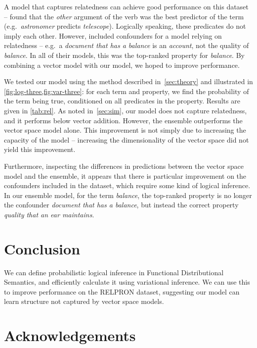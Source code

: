 \documentclass[11pt]{article}
\begin{document}
A model that captures relatedness can achieve good performance on this dataset --
\citeauthor{rimell2016relpron} found that the \textit{other} argument of the verb
was the best predictor of the term
(e.g.\ \textit{astronomer} predicts \textit{telescope}).
Logically speaking, these predicates do not imply each other.
However, \citeauthor{rimell2016relpron} included confounders for a model relying on relatedness --
e.g.\ a \textit{document that has a balance} is an \textit{account},
not the quality of \textit{balance}.
In all of their models, this was the top-ranked property for \textit{balance}.
By combining a vector model with our model,
we hoped to improve performance.

We tested our model using the method described in~\cref{sec:theory}
and illustrated in \cref{fig:log-three,fig:var-three}:
for each term and property, we find the probability of the term being true,
conditioned on all predicates in the property.
Results are given in \cref{tab:rel}.
As noted in~\cref{sec:sim}, our model does not capture relatedness,
and it performs below vector addition.
However, the ensemble outperforms the vector space model alone.
This improvement is not simply due to increasing the capacity of the model --
increasing the dimensionality of the vector space did not yield this improvement.

Furthermore, inspecting the differences in predictions
between the vector space model and the ensemble,
it appears that there is particular improvement on
the confounders included in the dataset,
which require some kind of logical inference.
In our ensemble model, for the term \textit{balance},
the top-ranked property is no longer the confounder \textit{document that has a balance},
but instead the correct property \textit{quality that an ear maintains}.



\section{Conclusion}

We can define probabilistic logical inference in Functional Distributional Semantics,
and efficiently calculate it using variational inference.
We can use this to improve performance on the RELPRON dataset,
suggesting our model can learn structure
not captured by vector space models.


\section*{Acknowledgements}
\end{document}
